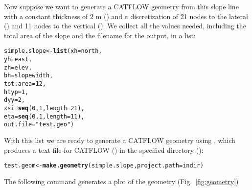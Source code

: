 \documentclass[article,nojss]{jss}\usepackage[]{graphicx}\usepackage[]{xcolor}
\makeatletter
\newcommand{\hlnum}[1]{\textcolor[rgb]{0.686,0.059,0.569}{#1}}%
\newcommand{\hlsng}[1]{\textcolor[rgb]{0.192,0.494,0.8}{#1}}%
\newcommand{\hldef}[1]{\textcolor[rgb]{0.345,0.345,0.345}{#1}}%
\newcommand{\hlkwb}[1]{\textcolor[rgb]{0.69,0.353,0.396}{#1}}%
\newcommand{\hlkwc}[1]{\textcolor[rgb]{0.333,0.667,0.333}{#1}}%
\newcommand{\hlkwd}[1]{\textcolor[rgb]{0.737,0.353,0.396}{\textbf{#1}}}%
\newenvironment{kframe}{%
 \def\at@end@of@kframe{}%
 \ifinner\ifhmode%
  \def\at@end@of@kframe{\end{minipage}}%
  \begin{minipage}{\columnwidth}%
 \fi\fi%
 \def\FrameCommand##1{\hskip\@totalleftmargin \hskip-\fboxsep
 \colorbox{shadecolor}{##1}\hskip-\fboxsep
     \hskip-\linewidth \hskip-\@totalleftmargin \hskip\columnwidth}%
 \MakeFramed {\advance\hsize-\width
   \@totalleftmargin\z@ \linewidth\hsize
   \@setminipage}}%
 {\par\unskip\endMakeFramed%
 \at@end@of@kframe}
\newenvironment{knitrout}{}{} %
\makeatother
\begin{document}
Now suppose we want to generate a CATFLOW geometry from this slope line with a constant thickness of 2 m () and a discretization of 21 nodes to the lateral () and 11 nodes to the vertical (). 
 We collect all the values needed, including the total area of the slope and the filename for the output, in a list:
\begin{knitrout}
\color{fgcolor}\begin{kframe}
\begin{alltt}
\hldef{simple.slope} \hlkwb{<-} \hlkwd{list}\hldef{(} \hlkwc{xh} \hldef{= north,}
                      \hlkwc{yh} \hldef{= east,}
                      \hlkwc{zh} \hldef{= elev,}
                      \hlkwc{bh} \hldef{= slopewidth,}
                      \hlkwc{tot.area} \hldef{=} \hlnum{12} \hldef{,}
                      \hlkwc{htyp} \hldef{=} \hlnum{1}\hldef{,}
                      \hlkwc{dyy} \hldef{=} \hlnum{2}\hldef{,}
                      \hlkwc{xsi} \hldef{=} \hlkwd{seq}\hldef{(}\hlnum{0}\hldef{,}\hlnum{1}\hldef{,}\hlkwc{length} \hldef{=} \hlnum{21}\hldef{),}
                      \hlkwc{eta} \hldef{=} \hlkwd{seq}\hldef{(}\hlnum{0}\hldef{,}\hlnum{1}\hldef{,}\hlkwc{length} \hldef{=} \hlnum{11}\hldef{),}
                      \hlkwc{out.file}\hldef{=}\hlsng{"test.geo"}      \hldef{)}
\end{alltt}
\end{kframe}
\end{knitrout}

With this list we are ready to generate a CATFLOW geometry using , 
which  produces a text file for CATFLOW () in the specified directory ():

                                  
\begin{knitrout}
\color{fgcolor}\begin{kframe}
\begin{alltt}
  \hldef{test.geom} \hlkwb{<-} \hlkwd{make.geometry}\hldef{(simple.slope,} \hlkwc{project.path} \hldef{= indir)}
\end{alltt}
\end{kframe}
\end{knitrout}

The following command generates a plot of the geometry (Fig.~\ref{fig:geometry})
\end{document}
